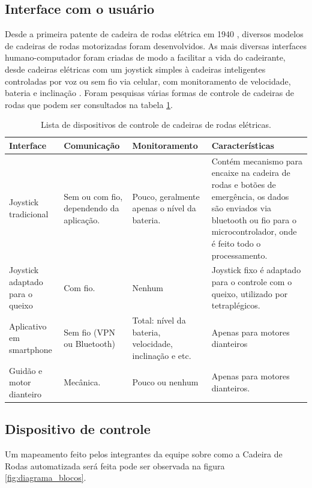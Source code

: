 \subsection{Interface com o usuário}

Desde a primeira patente de cadeira de rodas elétrica em 1940 \cite{patent_cadeira_rodas_eletrica}, diversos modelos de cadeiras de rodas motorizadas foram desenvolvidos. As mais diversas interfaces humano-computador foram criadas de modo a facilitar a vida do cadeirante, desde cadeiras elétricas com um joystick simples à cadeiras inteligentes controladas por voz ou sem fio via celular, com monitoramento de velocidade, bateria e inclinação \cite{artigo_controle_cadeira_eletrica}. Foram pesquisas várias formas de controle de cadeiras de rodas que podem ser consultados na tabela \ref{tab:interfaces}.

\begin{table}[!htb]
\centering
\begin{tabular}{|p{2cm}|p{3cm}|p{3cm}|p{4cm}|}
\hline
Interface & Comunicação & Monitoramento & Características \\ \hline
Joystick tradicional & Sem ou com fio, dependendo da aplicação. & Pouco, geralmente apenas o nível da bateria. & Contém mecanismo para encaixe na cadeira de rodas e botões de emergência, os dados são enviados via bluetooth ou fio para o microcontrolador, onde é feito todo o processamento. \\ \hline
Joystick adaptado para o queixo & Com fio. & Nenhum & Joystick fixo é adaptado para o controle com o queixo, utilizado por tetraplégicos. \\ \hline
Aplicativo em smartphone & Sem fio (VPN ou Bluetooth) & Total: nível da bateria, velocidade, inclinação e etc. & Apenas para motores dianteiros \\ \hline
Guidão e motor dianteiro & Mecânica. & Pouco ou nenhum & Apenas para motores dianteiros. \\ \hline
\end{tabular}
\caption{Lista de dispositivos de controle de cadeiras de rodas elétricas.}
\label{tab:interfaces}
\end{table}

\subsection{Dispositivo de controle}
Um mapeamento feito pelos integrantes da equipe sobre como a Cadeira de Rodas automatizada será feita pode ser observada na figura \ref{fig:diagrama_blocos}.

